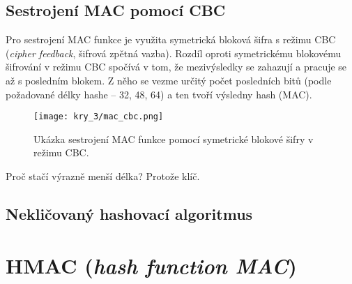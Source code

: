 \subsection*{Sestrojení MAC pomocí CBC}

Pro sestrojení MAC funkce je využita symetrická bloková šifra s režimu CBC (\textit{cipher feedback}, šifrová zpětná vazba). Rozdíl oproti symetrickému blokovému šifrování v režimu CBC spočívá v tom, že mezivýsledky se zahazují a pracuje se až s posledním blokem. Z něho se vezme určitý počet posledních bitů (podle požadované délky hashe -- 32, 48, 64) a ten tvoří výsledny hash (MAC).

\begin{figure}[H]
    \centering
    \texttt{[image: kry\_3/mac\_cbc.png]}
    \caption{Ukázka sestrojení MAC funkce pomocí symetrické blokové šifry v režimu CBC.}
\end{figure}


Proč stačí výrazně menší délka? Protože klíč.


\subsection*{Nekličovaný hashovací algoritmus}



\section{HMAC (\textit{hash function MAC})}

